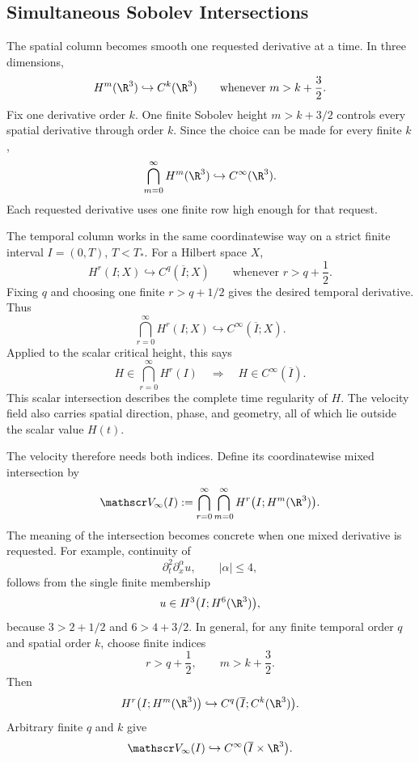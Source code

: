 
\subsection{Simultaneous Sobolev Intersections}\label{sub:SimultaneousSobolevIntersections}

The spatial column becomes smooth one requested derivative at a time.
In three dimensions,
\[
  H^m(\R^3)
  \hookrightarrow
  C^k(\R^3)
  \qquad
  \text{whenever }
  m>k+\frac32.
\]
Fix one derivative order \(k\).
One finite Sobolev height \(m>k+3/2\) controls every spatial derivative through order \(k\).
Since the choice can be made for every finite \(k\),
\[
  \bigcap_{m=0}^{\infty}H^m(\R^3)
  \hookrightarrow
  C^\infty(\R^3).
\]
Each requested derivative uses one finite row high enough for that request.

The temporal column works in the same coordinatewise way on a strict finite interval \(I=(0,T)\), \(T<T_*\).
For a Hilbert space \(X\),
\[
  H^r(I;X)
  \hookrightarrow
  C^q(\overline I;X)
  \qquad
  \text{whenever }
  r>q+\frac12.
\]
Fixing \(q\) and choosing one finite \(r>q+1/2\) gives the desired temporal derivative.
Thus
\[
  \bigcap_{r=0}^{\infty}H^r(I;X)
  \hookrightarrow
  C^\infty(\overline I;X).
\]
Applied to the scalar critical height, this says
\[
  H\in
  \bigcap_{r=0}^{\infty}H^r(I)
  \quad\Longrightarrow\quad
  H\in C^\infty(\overline I).
\]
This scalar intersection describes the complete time regularity of \(H\).
The velocity field also carries spatial direction, phase, and geometry, all of which lie outside the scalar value \(H(t)\).

The velocity therefore needs both indices.
Define its coordinatewise mixed intersection by
\[
  \mathscr V_\infty(I)
  :=
  \bigcap_{r=0}^{\infty}
  \bigcap_{m=0}^{\infty}
  H^r\bigl(I;H^m(\R^3)\bigr).
\]
The meaning of the intersection becomes concrete when one mixed derivative is requested.
For example, continuity of
\[
  \partial_t^2\partial_x^\alpha u,
  \qquad
  |\alpha|\leq4,
\]
follows from the single finite membership
\[
  u\in H^3\bigl(I;H^6(\R^3)\bigr),
\]
because \(3>2+1/2\) and \(6>4+3/2\).
In general, for any finite temporal order \(q\) and spatial order \(k\), choose finite indices
\[
  r>q+\frac12,
  \qquad
  m>k+\frac32.
\]
Then
\[
  H^r\bigl(I;H^m(\R^3)\bigr)
  \hookrightarrow
  C^q\bigl(\overline I;C^k(\R^3)\bigr).
\]
Arbitrary finite \(q\) and \(k\) give
\[
  \mathscr V_\infty(I)
  \hookrightarrow
  C^\infty\bigl(\overline I\times\R^3\bigr).
\]

